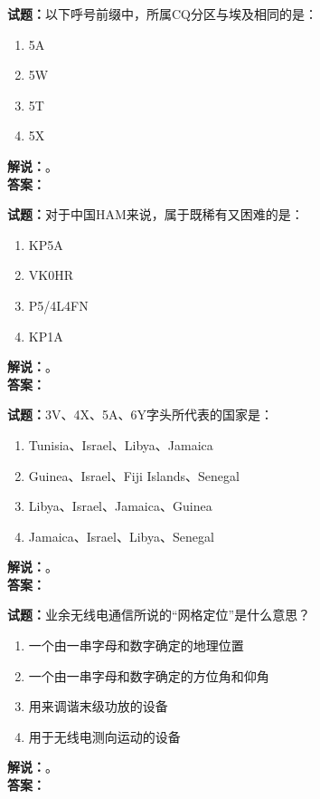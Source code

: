 \documentclass{ctexbook}
\begin{document}
\noindent\textbf{试题：}以下呼号前缀中，所属CQ分区与埃及相同的是：
\begin{enumerate}[leftmargin=3em]
\item 5A
\item 5W
\item 5T
\item 5X
\end{enumerate}
\noindent\textbf{解说：}\textbf{}。\\\noindent\textbf{答案：}

\bigskip




\noindent\textbf{试题：}对于中国HAM来说，属于既稀有又困难的是：
\begin{enumerate}[leftmargin=3em]
\item KP5A
\item VK0HR
\item P5/4L4FN
\item KP1A
\end{enumerate}
\noindent\textbf{解说：}\textbf{}。\\\noindent\textbf{答案：}

\bigskip




\noindent\textbf{试题：}3V、4X、5A、6Y字头所代表的国家是：
\begin{enumerate}[leftmargin=3em]
\item Tunisia、Israel、Libya、Jamaica %
\item Guinea、Israel、Fiji Islands、Senegal
\item Libya、Israel、Jamaica、Guinea
\item Jamaica、Israel、Libya、Senegal
\end{enumerate}
\noindent\textbf{解说：}\textbf{}。\\\noindent\textbf{答案：}

\bigskip




\noindent\textbf{试题：}业余无线电通信所说的“网格定位”是什么意思？
\begin{enumerate}[leftmargin=3em]
\item 一个由一串字母和数字确定的地理位置 %
\item 一个由一串字母和数字确定的方位角和仰角
\item 用来调谐末级功放的设备
\item 用于无线电测向运动的设备
\end{enumerate}
\noindent\textbf{解说：}\textbf{}。\\\noindent\textbf{答案：}
\end{document}
